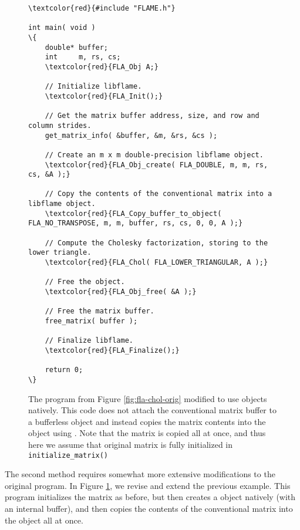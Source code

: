 \begin{figure}[t]
\begin{Verbatim}[frame=single,framesep=2.5mm,xleftmargin=5mm,commandchars=\\\{\},fontsize=\footnotesize]
\textcolor{red}{#include "FLAME.h"}

int main( void )
\{
    double* buffer;
    int     m, rs, cs;
    \textcolor{red}{FLA_Obj A;}

    // Initialize libflame.
    \textcolor{red}{FLA_Init();}

    // Get the matrix buffer address, size, and row and column strides.
    get_matrix_info( &buffer, &m, &rs, &cs );

    // Create an m x m double-precision libflame object.
    \textcolor{red}{FLA_Obj_create( FLA_DOUBLE, m, m, rs, cs, &A );}

    // Copy the contents of the conventional matrix into a libflame object.
    \textcolor{red}{FLA_Copy_buffer_to_object( FLA_NO_TRANSPOSE, m, m, buffer, rs, cs, 0, 0, A );}

    // Compute the Cholesky factorization, storing to the lower triangle.
    \textcolor{red}{FLA_Chol( FLA_LOWER_TRIANGULAR, A );}

    // Free the object.
    \textcolor{red}{FLA_Obj_free( &A );}

    // Free the matrix buffer.
    free_matrix( buffer );

    // Finalize libflame.
    \textcolor{red}{FLA_Finalize();}

    return 0;
\}
\end{Verbatim}
\caption{
The program from Figure \ref{fig:fla-chol-orig} modified to use 
\libflame objects natively.
This code does not attach the conventional matrix buffer to a bufferless
object and instead copies the matrix contents into the object using
\flacopybuffertoobjectns.
Note that the matrix is copied all at once, and thus here we assume that
original matrix is fully initialized in {\tt initialize\_matrix()}
}
\label{fig:fla-chol-native1}
\end{figure}

The second method requires somewhat more extensive modifications to the original
program.
In Figure \ref{fig:fla-chol-native1}, we revise and extend the previous
example.
This program initializes the matrix as before, but then creates a \libflame
object natively (with an internal buffer), and then copies the contents of
the conventional matrix into the \libflame object all at once.


